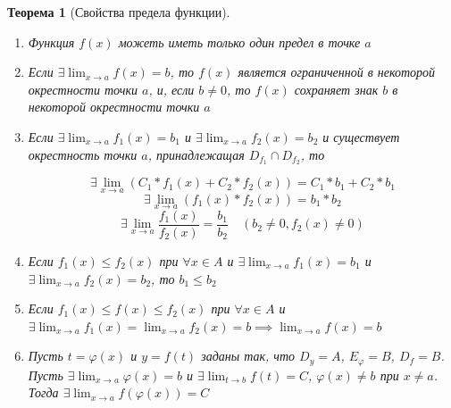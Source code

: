 \documentclass[a4paper,oneside]{article}
\newcommand{\dslim}{\displaystyle\lim}
\newtheorem{theorem}{Теорема}[subsection]
\theoremstyle{definition}
\theoremstyle{definition}
\theoremstyle{definition}
\begin{document}
\begin{theorem}[Свойства предела функции]
    \begin{enumerate}
        \item Функция $f(x)$ можеть иметь только один предел в точке $a$
        \item 
            Если $\exists \dslim_{x \to a} f(x) = b$, то $f(x)$ является 
            ограниченной в некоторой окрестности точки $a$, и, если $b \ne 0$, 
            то $f(x)$ сохраняет знак $b$ в некоторой окрестности точки $a$

        \item 
            Если $\exists \dslim_{x \to a} f_1 (x) = b_1$ и 
            $\exists \dslim_{x \to a} f_2 (x) = b_2$ и 
            существует окрестность точки $a$, принадлежащая $D_{f_1} \cap D_{f_2}$, то 

            \[ \exists \dslim_{x \to a} (C_1 * f_1(x) + C_2* f_2(x)) = C_1 * b_1 + C_2 * b_1 \]
            \[ \exists \dslim_{x \to a} (f_1(x) * f_2(x)) = b_1 * b_2 \]
            \[ \exists \dslim_{x \to a} \frac{f_1(x)}{f_2(x)} = \frac{b_1}{b_2} \quad (b_2 \ne 0, f_2(x) \ne 0) \]

        \item 
            Если $f_1(x) \le f_2(x)$ при $\forall x \in A$ и 
            $\exists \dslim_{x \to a} f_1(x) = b_1$ и 
            $\exists \dslim_{x \to a} f_2(x) = b_2$, то $b_1 \le b_2$

        \item
            Если $f_1(x) \le f(x) \le f_2(x)$ при $\forall x \in A$ и
            $\exists \dslim_{x \to a} f_1(x) = \dslim_{x \to a} f_2(x) = b \implies \dslim_{x \to a} f(x) = b$

        \item 
            Пусть $t =  \varphi(x)$ и $y = f(t)$ заданы так, что $D_y = A$, $E_\varphi = B$, $D_f = B$. 
            Пусть $\exists \dslim_{x \to a}  \varphi(x) = b$ и $\exists \dslim_{t \to b} f(t) = C$, $ \varphi(x) \ne b$ при $x \ne a$.
            Тогда $\exists \dslim_{x \to a} f( \varphi(x)) = C$
    \end{enumerate}
\end{theorem}
\end{document}
